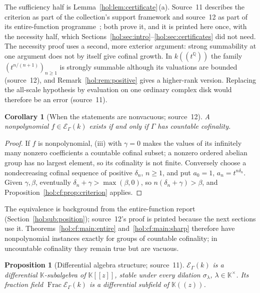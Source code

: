 \documentclass[11pt]{article}
\numberwithin{equation}{section}
\newtheorem{proposition}[theorem]{Proposition}
\newtheorem{corollary}[theorem]{Corollary}
\theoremstyle{definition}
\theoremstyle{remark}
\newcommand{\Q}{\mathbb Q}
\newcommand{\KK}{\mathbb K}
\newcommand{\EK}{\mathcal E_\Gamma(k)}
\newcommand{\FE}{\operatorname{Frac}\EK}
\begin{document}
The sufficiency half is Lemma~\ref{hol:lem:certificate}\,(a). Source~11
describes the criterion as part of the collection's support framework and
source~12 as part of its entire-function programme~\cite{repoentire}; both
prove it, and it is printed here once, with the necessity half, which
Sections~\ref{hol:sec:intro}--\ref{hol:sec:certificates} did not need. The
necessity proof uses a second, more exterior argument: strong summability at
one argument does not by itself give cofinal growth. In $k((t^\Q))$ the family
$(t^{n/(n+1)})_{n\ge1}$ is strongly summable although its valuations are
bounded (source~12), and Remark~\ref{hol:rem:positive} gives a higher-rank
version. Replacing the all-scale hypothesis by evaluation on one ordinary
complex disk would therefore be an error (source~11).

\begin{corollary}[When the statements are nonvacuous; source~12]
\label{hol:cf:cor:cofinality}
A nonpolynomial $f\in\EK$ exists if and only if $\Gamma$ has countable
cofinality.
\end{corollary}

\begin{proof}
If $f$ is nonpolynomial, (iii) with $\gamma=0$ makes the values of its
infinitely many nonzero coefficients a countable cofinal subset; a nonzero
ordered abelian group has no largest element, so its cofinality is not finite.
Conversely choose a nondecreasing cofinal sequence of positive $\delta_n$,
$n\ge1$, and put $a_0=1$, $a_n=t^{n\delta_n}$. Given $\gamma,\beta$, eventually
$\delta_n+\gamma>\max(\beta,0)$, so $n(\delta_n+\gamma)>\beta$, and
Proposition~\ref{hol:cf:prop:criterion} applies.
\end{proof}

The equivalence is background from the entire-function
report~\cite{repoentire} (Section~\ref{hol:sub:position}); source~12's proof is
printed because the next sections use it. Theorems~\ref{hol:cf:main:entire}
and~\ref{hol:cf:main:sharp} therefore have nonpolynomial instances exactly for
groups of countable cofinality; in uncountable cofinality they remain true but
are vacuous.

\begin{proposition}[Differential algebra structure; source~11]
\label{hol:cf:prop:ring}
$\EK$ is a differential $\KK$-subalgebra of $\KK[[z]]$, stable under every
dilation $\sigma_\lambda$, $\lambda\in\KK^\times$. Its fraction field $\FE$
is a differential subfield of $\KK((z))$.
\end{proposition}
\end{document}
